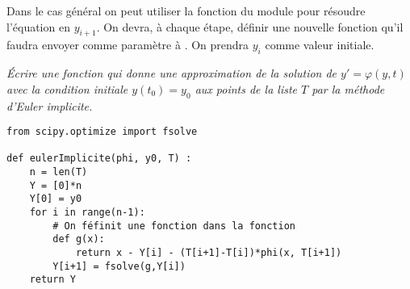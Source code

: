 \medskip

Dans le cas général on peut utiliser la fonction  du module  pour résoudre l'équation en $y_{i+1}$. On devra, à chaque étape, définir une nouvelle fonction qu'il faudra envoyer comme paramètre à . On prendra $y_i$ comme valeur initiale.
\begin{Exercise}[label={exo:impl}]\it 
Écrire une fonction  qui donne une approximation de la solution de $y' = \varphi(y, t)$ avec la condition initiale $y(t_0)=y_0$ aux points de la liste $T$ par la méthode d'Euler implicite.
\end{Exercise}
\begin{Answer}

\begin{lstlisting}
from scipy.optimize import fsolve 

def eulerImplicite(phi, y0, T) :
    n = len(T)
    Y = [0]*n
    Y[0] = y0 
    for i in range(n-1): 
        # On féfinit une fonction dans la fonction
        def g(x): 
            return x - Y[i] - (T[i+1]-T[i])*phi(x, T[i+1])
        Y[i+1] = fsolve(g,Y[i])  
    return Y
\end{lstlisting}
\end{Answer}

